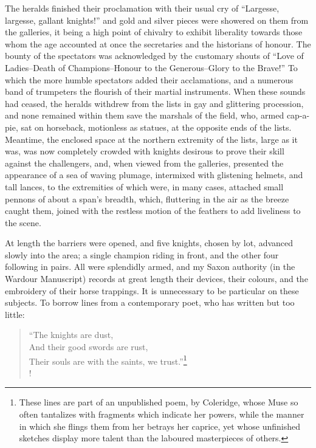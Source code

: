 The heralds finished their proclamation with their usual cry of
``Largesse, largesse, gallant knights!'' and gold and silver pieces were
showered on them from the galleries, it being a high point of chivalry
to exhibit liberality towards those whom the age accounted at once the
secretaries and the historians of honour. The bounty of the spectators
was acknowledged by the customary shouts of ``Love of Ladies--Death of
Champions--Honour to the Generous--Glory to the Brave!'' To which the
more humble spectators added their acclamations, and a numerous band of
trumpeters the flourish of their martial instruments. When these sounds
had ceased, the heralds withdrew from the lists in gay and glittering
procession, and none remained within them save the marshals of the
field, who, armed cap-a-pie, sat on horseback, motionless as statues, at
the opposite ends of the lists. Meantime, the enclosed space at the
northern extremity of the lists, large as it was, was now completely
crowded with knights desirous to prove their skill against the
challengers, and, when viewed from the galleries, presented the
appearance of a sea of waving plumage, intermixed with glistening
helmets, and tall lances, to the extremities of which were, in many
cases, attached small pennons of about a span's breadth, which,
fluttering in the air as the breeze caught them, joined with the
restless motion of the feathers to add liveliness to the scene.

At length the barriers were opened, and five knights, chosen by lot,
advanced slowly into the area; a single champion riding in front, and
the other four following in pairs. All were splendidly armed, and my
Saxon authority (in the Wardour Manuscript) records at great length
their devices, their colours, and the embroidery of their horse
trappings. It is unnecessary to be particular on these subjects. To
borrow lines from a contemporary poet, who has written but too little:

\begin{verse}
``The knights are dust,\\
And their good swords are rust,\\
Their souls are with the saints, we trust.''\footnote{These lines are
part of an unpublished poem, by
Coleridge, whose Muse so often tantalizes with fragments which indicate
her powers, while the manner in which she flings them from her betrays
her caprice, yet whose unfinished sketches display more talent than the
laboured masterpieces of others.}\\!
\end{verse}

